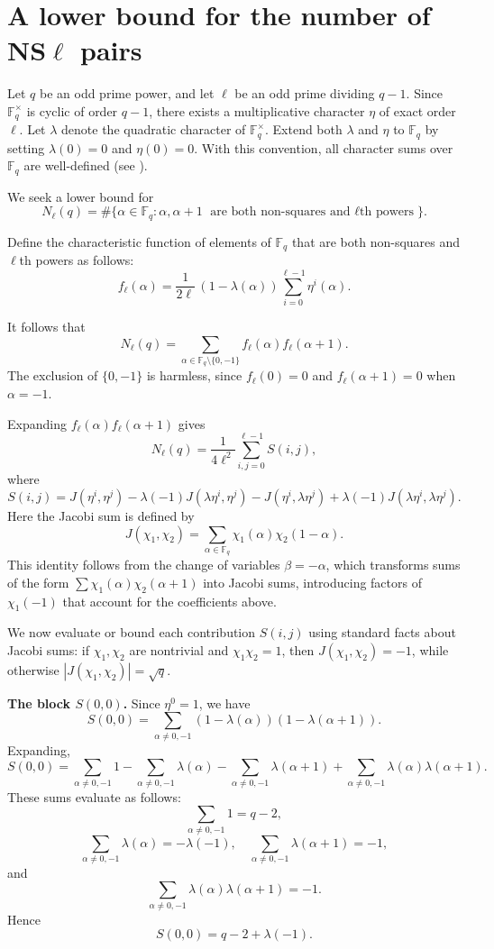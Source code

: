 \documentclass[12pt]{amsart}
\numberwithin{equation}{section}
\newcommand{\F}{\mathbb{F}_q}
\begin{document}
 \bigskip
\section{A lower bound for the number of NS$\ell$ pairs}\label{lb}

Let $q$ be an odd prime power, and let $\ell$ be an odd prime dividing $q-1$. Since $\F^\times$ is cyclic of order $q-1$, there exists a multiplicative character $\eta$ of exact order $\ell$. Let $\lambda$ denote the quadratic character of $\F^\times$. Extend both $\lambda$ and $\eta$ to $\F$ by setting $\lambda(0)=0$ and $\eta(0)=0$. With this convention, all character sums over $\F$ are well-defined (see \cite{BEW1998}).

We seek a lower bound for
\[
N_{\ell}(q) = \#\{\alpha \in \F: \alpha, \alpha+1 \text{ are both non-squares and $\ell$th powers}\}.
\]

Define the characteristic function of elements of $\F$ that are both non-squares and $\ell$th powers as follows:
\[
f_\ell(\alpha) = \frac{1}{2\ell}\,(1-\lambda(\alpha)) \sum_{i=0}^{\ell-1} \eta^i(\alpha).
\]


It follows that
\[
N_\ell(q) = \sum_{\alpha \in \F\setminus \{0,-1\}} f_\ell(\alpha) f_\ell(\alpha+1).
\]
The exclusion of $\{0,-1\}$ is harmless, since $f_\ell(0)=0$ and $f_\ell(\alpha+1)=0$ when $\alpha=-1$.

Expanding $f_\ell(\alpha)f_\ell(\alpha+1)$ gives
\[
N_\ell(q) = \frac{1}{4\ell^2} \sum_{i,j=0}^{\ell-1} S(i,j),
\]
where
\begin{equation}\label{Neq2}
S(i,j) = J(\eta^i, \eta^j) - \lambda(-1) J(\lambda \eta^i, \eta^j) - J(\eta^i, \lambda \eta^j) + \lambda(-1) J(\lambda \eta^i, \lambda \eta^j).
\end{equation}
Here the Jacobi sum is defined by
\[
J(\chi_1,\chi_2) = \sum_{\alpha \in \F} \chi_1(\alpha)\chi_2(1-\alpha).
\]
This identity follows from the change of variables $\beta=-\alpha$, which transforms sums of the form $\sum \chi_1(\alpha)\chi_2(\alpha+1)$ into Jacobi sums, introducing factors of $\chi_1(-1)$ that account for the coefficients above.

We now evaluate or bound each contribution $S(i,j)$ using standard facts about Jacobi sums: if $\chi_1,\chi_2$ are nontrivial and $\chi_1\chi_2=1$, then $J(\chi_1,\chi_2)=-1$, while otherwise $|J(\chi_1,\chi_2)|=\sqrt{q}$.

\medskip

\noindent
\textbf{The block $S(0,0)$.}
Since $\eta^0=1$, we have
\[
S(0,0) = \sum_{\alpha \ne 0,-1} (1-\lambda(\alpha))(1-\lambda(\alpha+1)).
\]
Expanding,
\[
S(0,0)
= \sum_{\alpha \ne 0,-1} 1
- \sum_{\alpha \ne 0,-1} \lambda(\alpha)
- \sum_{\alpha \ne 0,-1} \lambda(\alpha+1)
+ \sum_{\alpha \ne 0,-1} \lambda(\alpha)\lambda(\alpha+1).
\]
These sums evaluate as follows:
\[
\sum_{\alpha \ne 0,-1} 1 = q-2,
\]
\[
\sum_{\alpha \ne 0,-1} \lambda(\alpha) = -\lambda(-1),
\quad
\sum_{\alpha \ne 0,-1} \lambda(\alpha+1) = -1,
\]
and
\[
\sum_{\alpha \ne 0,-1} \lambda(\alpha)\lambda(\alpha+1) = -1.
\]
Hence
\[
S(0,0) = q - 2 + \lambda(-1).
\]
\end{document}
